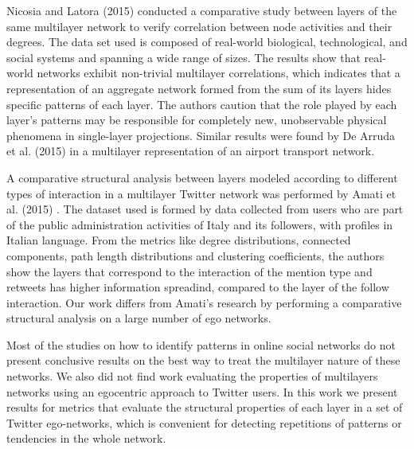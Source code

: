 Nicosia and Latora (2015) \cite{Nicosia2015} conducted a comparative study between layers of the same multilayer network to verify correlation between node activities and their degrees. The data set used is composed of real-world biological, technological, and social systems and spanning a wide range of sizes. The results show that real-world networks exhibit non-trivial multilayer correlations, which indicates that a representation of an aggregate network formed from the sum of its layers hides specific patterns of each layer. The authors caution that the role played by each layer's patterns may be responsible for completely new, unobservable physical phenomena in single-layer projections. Similar results were found by De Arruda et al. (2015) \cite{DeArruda2016} in a multilayer representation of an airport transport network.

A comparative structural analysis between layers modeled according to different types of interaction in a multilayer Twitter network was performed by Amati et al. (2015) \cite{Amati2015}. The dataset used is formed by data collected from users who are part of the public administration activities of Italy and its followers, with profiles in Italian language. From the metrics like degree distributions, connected components, path length distributions and clustering coefficients, the authors show the layers that correspond to the interaction of the mention type and retweets has higher information spreadind, compared to the layer of the follow interaction. Our work differs from Amati's research by performing a comparative structural analysis on a large number of ego networks.

Most of the studies on how to identify patterns in online social networks do not present conclusive results on the best way to treat the multilayer nature of these networks. We also did not find work evaluating the properties of multilayers networks using an egocentric approach to Twitter users. In this work we present results for metrics that evaluate the structural properties of each layer in a set of Twitter ego-networks, which is convenient for detecting repetitions of patterns or tendencies in the whole network.



